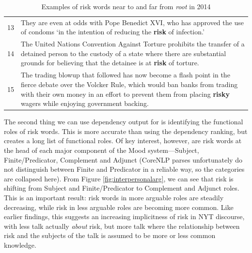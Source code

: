 \begin{table}
\begin{tabularx}{\linewidth}{p{}p{}}
    13   & They are even at odds with Pope Benedict XVI, who has approved the use of condoms `in the intention of reducing the \textbf{risk} of infection.'   \\ 
    14   &  The United Nations Convention Against Torture prohibits the transfer of a detained person to the custody of a state where there are substantial grounds for believing that the detainee is at \textbf{risk} of torture. \\ 
    15    &  The trading blowup that followed has now become a flash point in the fierce debate over the Volcker Rule, which would ban banks from trading with their own money in an effort to prevent them from placing \textbf{risky} wagers while enjoying government backing.  \\ 
    \bottomrule

    \end{tabularx}
    \caption{Examples of risk words near to and far from \emph{root} in 2014}
    \label{conc:distanceroot}
    \end{table}


    The second thing we can use dependency output for is identifying the functional roles of risk words. This is more accurate than using the dependency ranking, but creates a long list of functional roles. Of key interest, however, are risk words at the head of each major component of the Mood system---Subject, Finite\slash Predicator, Complement and Adjunct (CoreNLP parses unfortunately do not distinguish between Finite and Predicator in a reliable way, so the categories are collapsed here). From Figure \ref{fig:interpersonalarg}, we can see that risk is shifting from Subject and Finite\slash Predicator to Complement and Adjunct roles. This is an important result: risk words in more arguable roles are steadily decreasing, while risk in less arguable roles are becoming more common. Like earlier findings, this suggests an increasing implicitness of risk in NYT discourse, with less talk actually \emph{about} risk, but more talk where the relationship between risk and the subjects of the talk is assumed to be more or less common knowledge.

